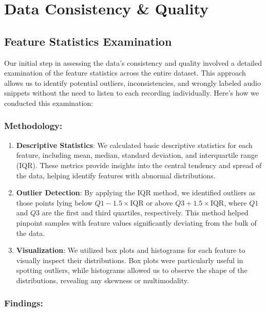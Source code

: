 \section{Data Consistency \& Quality}

\subsection{Feature Statistics Examination}

Our initial step in assessing the data's consistency and quality involved a detailed examination of the feature statistics across the entire dataset. This approach allows us to identify potential outliers, inconsistencies, and wrongly labeled audio snippets without the need to listen to each recording individually. Here's how we conducted this examination:

\subsubsection{Methodology:}

\begin{enumerate}
    \item \textbf{Descriptive Statistics}: We calculated basic descriptive statistics for each feature, including mean, median, standard deviation, and interquartile range (IQR). These metrics provide insights into the central tendency and spread of the data, helping identify features with abnormal distributions.
    \item \textbf{Outlier Detection}: By applying the IQR method, we identified outliers as those points lying below \(Q1 - 1.5 \times \text{IQR}\) or above \(Q3 + 1.5 \times \text{IQR}\), where \(Q1\) and \(Q3\) are the first and third quartiles, respectively. This method helped pinpoint samples with feature values significantly deviating from the bulk of the data.
    \item \textbf{Visualization}: We utilized box plots and histograms for each feature to visually inspect their distributions. Box plots were particularly useful in spotting outliers, while histograms allowed us to observe the shape of the distributions, revealing any skewness or multimodality.
\end{enumerate}

\subsubsection{Findings:}

